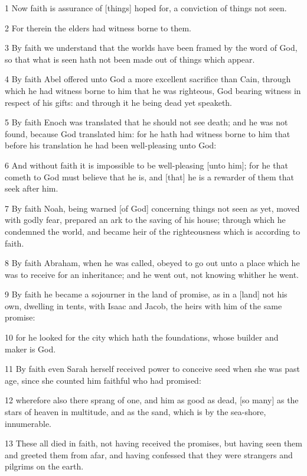 \par 1 Now faith is assurance of [things] hoped for, a conviction of things not seen.
\par 2 For therein the elders had witness borne to them.
\par 3 By faith we understand that the worlds have been framed by the word of God, so that what is seen hath not been made out of things which appear.
\par 4 By faith Abel offered unto God a more excellent sacrifice than Cain, through which he had witness borne to him that he was righteous, God bearing witness in respect of his gifts: and through it he being dead yet speaketh.
\par 5 By faith Enoch was translated that he should not see death; and he was not found, because God translated him: for he hath had witness borne to him that before his translation he had been well-pleasing unto God:
\par 6 And without faith it is impossible to be well-pleasing [unto him]; for he that cometh to God must believe that he is, and [that] he is a rewarder of them that seek after him.
\par 7 By faith Noah, being warned [of God] concerning things not seen as yet, moved with godly fear, prepared an ark to the saving of his house; through which he condemned the world, and became heir of the righteousness which is according to faith.
\par 8 By faith Abraham, when he was called, obeyed to go out unto a place which he was to receive for an inheritance; and he went out, not knowing whither he went.
\par 9 By faith he became a sojourner in the land of promise, as in a [land] not his own, dwelling in tents, with Isaac and Jacob, the heirs with him of the same promise:
\par 10 for he looked for the city which hath the foundations, whose builder and maker is God.
\par 11 By faith even Sarah herself received power to conceive seed when she was past age, since she counted him faithful who had promised:
\par 12 wherefore also there sprang of one, and him as good as dead, [so many] as the stars of heaven in multitude, and as the sand, which is by the sea-shore, innumerable.
\par 13 These all died in faith, not having received the promises, but having seen them and greeted them from afar, and having confessed that they were strangers and pilgrims on the earth.
